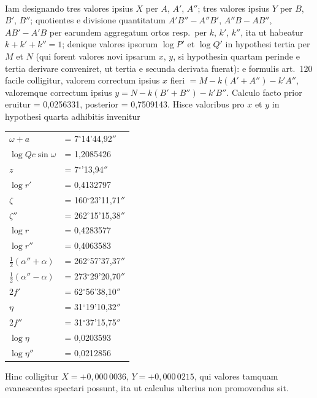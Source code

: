 \documentclass[12pt,a4paper]{article}
\begin{document}
\paragraph{}
Iam designando tres valores ipsius $X$ per $A$, $A'$, $A''$; tres valores ipsius $Y$ per $B$, $B'$, $B''$; quotientes e divisione quantitatum $A'B'' - A''B'$, $A''B - AB''$, $AB' - A'B$ per earundem aggregatum ortos resp.~per $k$, $k'$, $k''$, ita ut habeatur $k + k' + k'' = 1$; denique valores ipsorum $\log P'$ et $\log Q'$ in hypothesi tertia per $M$ et $N$ (qui forent valores novi ipsarum $x$, $y$, si hypothesin quartam perinde e tertia derivare conveniret, ut tertia e secunda derivata fuerat): e formulis art.~120 facile colligitur, valorem correctum ipsius $x$ fieri $= M - k(A' + A'') - k'A''$, valoremque correctum ipsius $y = N - k(B' + B'') - k'B''$. Calculo facto prior eruitur = 0,0256331, posterior = 0,7509143. Hisce valoribus pro $x$ et $y$ in hypothesi quarta adhibitis invenitur

\begin{center}
\begin{tabular}{ll}
\toprule
$\omega + a$ & = 7$^\circ$14'44,92$''$\\
$\log Qc\sin\omega$ & = 1,2085426\\
$z$ & = 7$^\circ$\;\;2'13,94$''$\\
$\log r'$ & = 0,4132797\\
$\zeta$ & = 160$^\circ$23'11,71$''$\\
$\zeta''$ & = 262$^\circ$15'15,38$''$\\
$\log r$ & = 0,4283577\\
$\log r''$ & = 0,4063583\\
$\tfrac{1}{2}(\alpha'' + \alpha)$ & = 262$^\circ$57'37,37$''$\\
$\tfrac{1}{2}(\alpha'' - \alpha)$ & = 273$^\circ$29'20,70$''$\\
$2f'$ & = 62$^\circ$56'38,10$''$\\
$\eta$ & = 31$^\circ$19'10,32$''$\\
$2f''$ & = 31$^\circ$37'15,75$''$\\
$\log\eta$ & = 0,0203593\\
$\log\eta''$ & = 0,0212856\\
\bottomrule
\end{tabular}
\end{center}

Hinc colligitur $X = +0,000\,0036$, $Y = +0,000\,0215$, qui valores tamquam evanescentes spectari possunt, ita ut calculus ulterius non promovendus sit.
\end{document}
